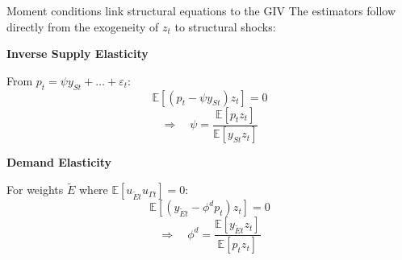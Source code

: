 \documentclass[aspectratio=169,11pt]{beamer}
\begin{document}
\begin{frame}{Moment conditions link structural equations to the GIV}
    \vspace{0.5cm}
    \centering
    The estimators follow directly from the exogeneity of $z_t$ to structural shocks:
    
    \vspace{0.6cm}
    \begin{minipage}{0.48\textwidth}
        \centering
        \textbf{Inverse Supply Elasticity}
        
        \vspace{0.2cm}
        From $p_t = \psi y_{St} + \dots + \varepsilon_t$:
        \begin{equation*}
            \mathbb{E}[(p_t - \psi y_{St}) z_t] = 0
        \end{equation*}
        \vspace{0.1cm}
        \begin{equation*}
            \Rightarrow \quad \psi = \frac{\mathbb{E}[p_t z_t]}{\mathbb{E}[y_{St} z_t]}
        \end{equation*}
    \end{minipage}
    \hfill
    \begin{minipage}{0.48\textwidth}
        \centering
        \textbf{Demand Elasticity}
        
        \vspace{0.2cm}
        For weights $\tilde{E}$ where $\mathbb{E}[u_{\tilde{E}t} u_{\Gamma t}] = 0$:
        \begin{equation*}
            \mathbb{E}[(y_{\tilde{E}t} - \phi^d p_t) z_t] = 0
        \end{equation*}
        \vspace{0.1cm}
        \begin{equation*}
            \Rightarrow \quad \phi^d = \frac{\mathbb{E}[y_{\tilde{E}t} z_t]}{\mathbb{E}[p_t z_t]}
        \end{equation*}
    \end{minipage}
\end{frame}
\end{document}
